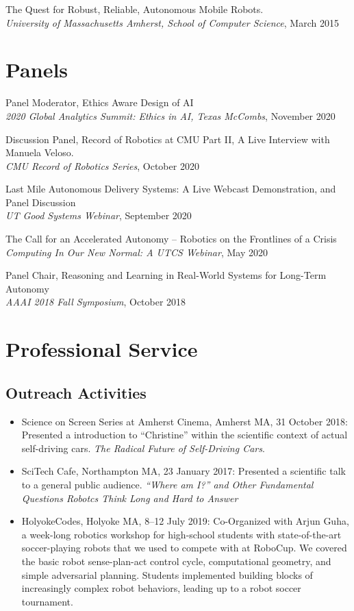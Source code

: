 \documentclass[Times]{article}
\begin{document}
The Quest for Robust, Reliable, Autonomous Mobile Robots.\\
{\em University of Massachusetts Amherst, School of Computer Science}, March 2015


\section*{Panels}
Panel Moderator, Ethics Aware Design of AI\\
{\em 2020 Global Analytics Summit: Ethics in AI, Texas McCombs}, November 2020

Discussion Panel, Record of Robotics at CMU Part II, A Live Interview with
Manuela Veloso.\\
{\em CMU Record of Robotics Series}, October 2020

Last Mile Autonomous Delivery Systems: A Live Webcast Demonstration, and Panel Discussion\\
{\em UT Good Systems Webinar}, September 2020

The Call for an Accelerated Autonomy -- Robotics on the Frontlines of a Crisis\\
{\em Computing In Our New Normal: A UTCS Webinar}, May 2020

Panel Chair, Reasoning and Learning in Real-World Systems for Long-Term
Autonomy\\
{\em AAAI 2018 Fall Symposium}, October 2018

\section*{Professional Service}

\subsection*{Outreach Activities}
\begin{itemize}
\item Science on Screen Series at Amherst Cinema, Amherst MA, 31 October 2018:
Presented a introduction to ``Christine'' within the scientific context of
actual self-driving cars. \emph{The Radical Future of Self-Driving Cars}.
\item SciTech Cafe, Northampton MA, 23 January 2017: Presented a scientific talk
to a general public audience. \emph{``Where am I?'' and
  Other Fundamental Questions Robotcs Think Long and Hard to Answer}
\item HolyokeCodes, Holyoke MA, 8--12 July 2019: Co-Organized with Arjun Guha, a week-long
robotics workshop for high-school students with state-of-the-art soccer-playing
robots that we used to compete with at RoboCup. We
covered the basic robot sense-plan-act control cycle, computational geometry,
and simple adversarial planning. Students implemented building blocks of
increasingly complex robot behaviors, leading up to a robot soccer tournament.
\end{itemize}
\end{document}
